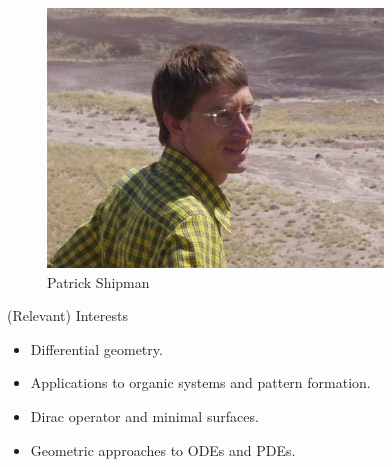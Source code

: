 \documentclass[aspectratio=169]{beamer}
\begin{document}
       \begin{frame}{}
\vfill
        \begin{figure}
            \centering
            \includegraphics[width=.6\textwidth]{patrick.jpg}
			\caption{Patrick Shipman}
        \end{figure}
\vfill
    \end{frame}

    \begin{frame}{(Relevant) Interests}
\vfill
        \begin{itemize}
            \item Differential geometry.
            \item Applications to organic systems and pattern formation.
            \item Dirac operator and minimal surfaces.
			\item Geometric approaches to ODEs and PDEs.
        \end{itemize}
\vfill
    \end{frame}
   
\end{document}
